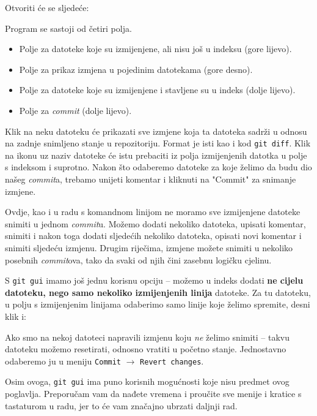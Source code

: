 
Otvoriti će se sljedeće:


Program se sastoji od četiri polja. 

\begin{itemize}
	\item Polje za datoteke koje su izmijenjene, ali nisu još u indeksu (gore lijevo).
	\item Polje za prikaz izmjena u pojedinim datotekama (gore desno). 
	\item Polje za datoteke koje su izmijenjene i stavljene su u indeks (dolje lijevo).
	\item Polje za \emph{commit} (dolje lijevo).
\end{itemize}

Klik na neku datoteku će prikazati sve izmjene koja ta datoteka sadrži u odnosu na zadnje snimljeno stanje u repozitoriju.
Format je isti kao i kod \verb+git diff+.
Klik na ikonu uz naziv datoteke će istu prebaciti iz polja izmijenjenih datotka u polje s indeksom i suprotno.
Nakon što odaberemo datoteke za koje želimo da budu dio našeg \emph{commit}a, trebamo unijeti komentar i kliknuti na "Commit" za snimanje izmjene.

Ovdje, kao i u radu s komandnom linijom ne moramo sve izmijenjene datoteke snimiti u jednom \emph{commit}u. 
Možemo dodati nekoliko datoteka, upisati komentar, snimiti i nakon toga dodati sljedećih nekoliko datoteka, opisati novi komentar i snimiti sljedeću izmjenu.
Drugim riječima, izmjene možete snimiti u nekoliko posebnih \emph{commit}ova, tako da svaki od njih čini zasebnu logičku cjelinu.

S \verb+git gui+ imamo još jednu korisnu opciju -- možemo u indeks dodati \textbf{ne cijelu datoteku, nego samo nekoliko izmijenjenih linija} datoteke.
Za tu datoteku, u polju s izmijenjenim linijama odaberimo samo linije koje želimo spremite, desni klik i:


Ako smo na nekoj datoteci napravili izmjenu koju \emph{ne} želimo snimiti -- takvu datoteku možemo resetirati, odnosno vratiti u početno stanje. 
Jednostavno odaberemo ju u meniju \verb+Commit+ $\rightarrow$ \verb+Revert changes+.

Osim ovoga, \verb+git gui+ ima puno korisnih mogućnosti koje nisu predmet ovog poglavlja.
Preporučam vam da nađete vremena i proučite sve menije i kratice s tastaturom u radu, jer to će vam značajno ubrzati daljnji rad.

